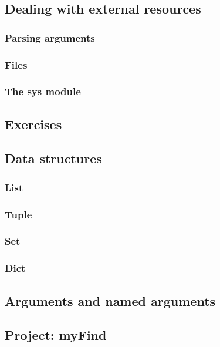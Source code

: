 \subsection{Dealing with external resources}
\subsubsection{Parsing arguments}
\subsubsection{Files}
\subsubsection{The sys module}

\subsection{Exercises}

\subsection{Data structures}
\subsubsection{List}
\subsubsection{Tuple}
\subsubsection{Set}
\subsubsection{Dict}

\subsection{Arguments and named arguments}

\subsection{Project: myFind}
